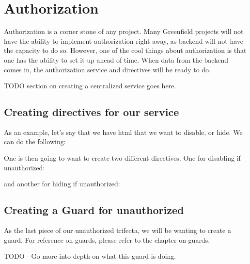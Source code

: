 \maketitle{}
\section{ Authorization }

Authorization is a corner stone of any project. Many Greenfield projects will
not have the ability to implement authorization right away, as backend will not
have the capacity to do so. However, one of the cool things about authorization
is that one has the ability to set it up ahead of time. When data from the
backend comes in, the authorization service and directives will be ready to do.

TODO section on creating a centralized service goes here.

\subsection{Creating directives for our service}
As an example, let's say that we have html that we want to disable, or hide. We
can do the following:


One is then going to want to create two different directives. One for disabling
if unauthorized:

and another for hiding if unauthorized:


\subsection{Creating a Guard for unauthorized}
As the last piece of our unauthorized trifecta, we will be wanting to create a
guard. For reference on guards, please refer to the chapter on guards.

TODO - Go more into depth on what this guard is doing.

